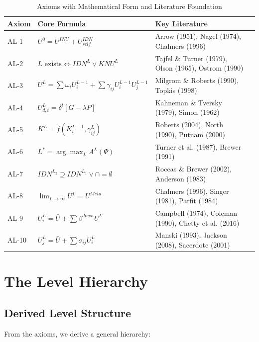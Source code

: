 \begin{table}[htbp]
\centering
\caption{Axioms with Mathematical Form and Literature Foundation}
\label{tab:aaa-axiom-summary}
\renewcommand{\arraystretch}{1.3}
\small
\begin{tabular}{@{}llll@{}}
\toprule
\textbf{Axiom} & \textbf{Core Formula} & \textbf{Key Literature} \\
\midrule
AL-1 & $U^0 = U^{INU} + U^{IDN}_{self}$ & Arrow (1951), Nagel (1974), Chalmers (1996) \\
AL-2 & $L \text{ exists} \iff IDN^L \lor KNU^L$ & Tajfel \& Turner (1979), Olson (1965), Ostrom (1990) \\
AL-3 & $U^L = \sum \omega_i U^{L-1}_i + \sum \gamma_{ij} U^{L-1}_i U^{L-1}_j$ & Milgrom \& Roberts (1990), Topkis (1998) \\
AL-4 & $U^L_{d,t} = \delta^t [G - \lambda P]$ & Kahneman \& Tversky (1979), Simon (1962) \\
AL-5 & $K^L = f(K^{L-1}_i, \gamma^L_{ij})$ & Roberts (2004), North (1990), Putnam (2000) \\
AL-6 & $L^* = \arg\max_L A^L(\Psi)$ & Turner et al. (1987), Brewer (1991) \\
AL-7 & $IDN^{L_2} \supseteq IDN^{L_1} \lor \cap = \emptyset$ & Roccas \& Brewer (2002), Anderson (1983) \\
AL-8 & $\lim_{L \to \infty} U^L = U^{Meta}$ & Chalmers (1996), Singer (1981), Parfit (1984) \\
AL-9 & $U^L_i = \bar{U} + \sum \beta^{down} U^{L'}$ & Campbell (1974), Coleman (1990), Chetty et al. (2016) \\
AL-10 & $U^L_j = \bar{U} + \sum \sigma_{ij} U^L_i$ & Manski (1993), Jackson (2008), Sacerdote (2001) \\
\bottomrule
\end{tabular}
\end{table}
\section{The Level Hierarchy}
\label{sec:aaa-hierarchy}

\subsection{Derived Level Structure}

From the axioms, we derive a general hierarchy:


